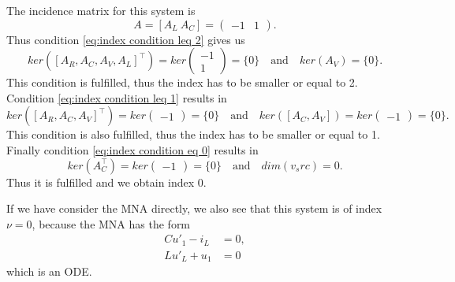 \begin{example2}
	The incidence matrix for this system is
	\begin{displaymath}
		A = [A_L~A_C] = 
		\left(
		\begin{matrix}
			-1 & 1
		\end{matrix}
		\right).
	\end{displaymath} 
	Thus condition \eqref{eq:index condition leq 2} gives us
	\begin{displaymath}
		ker([A_R, A_C, A_V, A_L]^\top) = ker
		\left(
		\begin{matrix}
			-1 \\
			1
		\end{matrix}
		\right) = \{0\}
		\quad \text{and} \quad 
		ker(A_V) = \{0\}.
	\end{displaymath}
	This condition is fulfilled, thus the index has to be smaller or equal to 2. \\
	Condition \eqref{eq:index condition leq 1} results in
	\begin{displaymath}
		ker([A_R, A_C, A_V]^\top) = ker\left(
		\begin{matrix}
			-1
		\end{matrix}
		\right) = \{0\}
		\quad \text{and} \quad
		ker([A_C, A_V]) = ker
		\left(
		\begin{matrix}
			-1
		\end{matrix}
		\right) = \{0\}.
	\end{displaymath}
	This condition is also fulfilled, thus the index has to be smaller or equal to 1.\\
	Finally condition \eqref{eq:index condition eq 0} results in
	\begin{displaymath}
		ker(A_C^\top) = ker\left(
		\begin{matrix}
			-1
		\end{matrix}
		\right) = \{0\}		
		\quad \text{and} \quad 
		dim(v_src) = 0.
	\end{displaymath}
	Thus it is fulfilled and we obtain index 0.
	
	If we have consider the MNA directly, we also see that this system is of index $\nu = 0$, because the MNA has the form
	\begin{displaymath}
		\begin{aligned}
			C u'_1 - i_L &= 0, \\
			L u'_L + u_1 &= 0
		\end{aligned}
	\end{displaymath}
	which is an ODE.
\end{example2}
	
